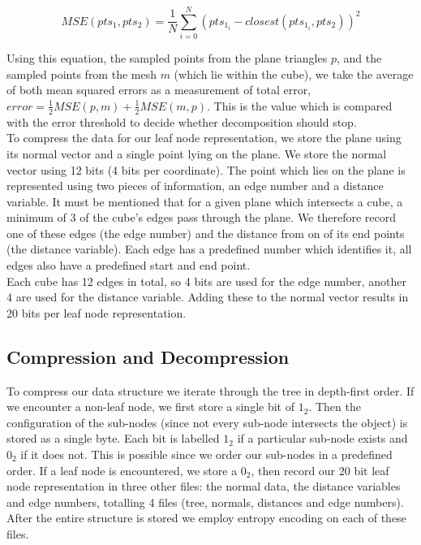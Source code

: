\begin{equation}
 \label{eqn:MSE_1}
MSE(pts_1, pts_2) = \frac{1}{N}\sum_{i=0}^{N} (pts_{1_i} - closest(pts_{1_i}, pts_2))^2
\end{equation}

Using this equation, the sampled points from the plane triangles $p$, and the sampled points from the mesh $m$ (which lie within the cube), we take the average of both mean squared errors as a measurement of total error, $error = \frac{1}{2}MSE(p,m) + \frac{1}{2}MSE(m,p)$. This is the value which is compared with the error threshold to decide whether decomposition should stop. \\

To compress the data for our leaf node representation, we store the plane using its normal vector and a single point lying on the plane. We store the normal vector using 12 bits (4 bits per coordinate). The point which lies on the plane is represented using two pieces of information, an edge number and a distance variable. It must be mentioned that for a given plane which intersects a cube, a minimum of 3 of the cube's edges pass through the plane. We therefore record one of these edges (the edge number) and the distance from on of its end points (the distance variable). Each edge has a predefined number which identifies it, all edges also have a predefined start and end point. \\

Each cube has 12 edges in total, so 4 bits are used for the edge number, another 4 are used for the distance variable. Adding these to the normal vector results in 20 bits per leaf node representation.  \\


\subsection{Compression and Decompression}

To compress our data structure we iterate through the tree in depth-first order. If we encounter a non-leaf node, we first store a single bit of $1_2$. Then the configuration of the sub-nodes (since not every sub-node intersects the object) is stored as a single byte. Each bit is labelled $1_2$ if a particular sub-node exists and $0_2$ if it does not. This is possible since we order our sub-nodes in a predefined order. If a leaf node is encountered, we store a $0_2$, then record our 20 bit leaf node representation in three other files: the normal data, the distance variables and edge numbers, totalling 4 files (tree, normals, distances and edge numbers). After the entire structure is stored we employ entropy encoding on each of these files. \\


